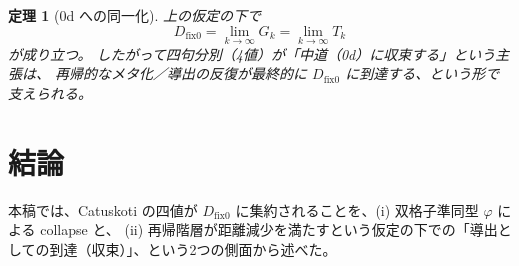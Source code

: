 \documentclass[12pt,a4paper]{article}
\newcommand{\dfix}{D_{\mathrm{fix}0}} %
\newcommand{\phiMap}{\varphi}            %
\newtheorem{theorem}{定理}[section]
\begin{document}
\begin{theorem}[0d への同一化]
上の仮定の下で
\[
\dfix
= \lim_{k \to \infty} G_k
= \lim_{k \to \infty} T_k
\]
が成り立つ。
したがって四句分別（4値）が「中道（0d）に収束する」という主張は、
再帰的なメタ化／導出の反復が最終的に $\dfix$ に到達する、という形で支えられる。
\end{theorem}

\section{結論}

本稿では、Catuskoti の四値が $\dfix$ に集約されることを、(i) 双格子準同型 $\phiMap$ による collapse と、
(ii) 再帰階層が距離減少を満たすという仮定の下での「導出としての到達（収束）」、という2つの側面から述べた。
\end{document}
